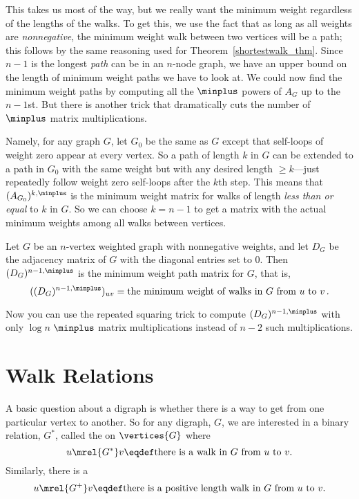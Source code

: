 \begin{editingnotes}
This takes us most of the way, but we really want the minimum weight
regardless of the lengths of the walks.  To get this, we use the fact that
as long as all weights are \emph{nonnegative}, the minimum weight walk
between two vertices will be a path; this follows by the same reasoning
used for Theorem~\ref{shortestwalk_thm}.  Since $n-1$ is the longest \emph{path}
can be in an $n$-node graph, we have an upper bound on the length of
minimum weight paths we have to look at.  We could now find the minimum
weight paths by computing all the $\minplus$ powers of $A_G$ up to the
$n-1$st.  But there is another trick that dramatically cuts the number of
$\minplus$ matrix multiplications.

Namely, for any graph $G$, let $G_0$ be the same as $G$ except that
self-loops of weight zero appear at every vertex.  So a path of length $k$
in $G$ can be extended to a path in $G_0$ with the same weight but with
any desired length $ \geq k$---just repeatedly follow weight zero
self-loops after the $k$th step.  This means that $(A_{G_0})^{k, \minplus}$
is the minimum weight matrix for walks of length \emph{less than or equal}
to $k$ in $G$.  So we can choose $k = n-1$ to get a matrix with the
actual minimum weights among all walks between vertices.

\begin{theorem}\label{thm:minweightmatrix}
Let $G$ be an $n$-vertex weighted graph with nonnegative weights, and let
$D_G$ be the adjacency matrix of $G$ with the diagonal entries set to 0.
Then $(D_G)^{n-1, \minplus}$ is the minimum weight path matrix for $G$, that
is,
\[
((D_G)^{n-1, \minplus})_{uv} = \text{the minimum weight of walks in $G$ from
 $u$ to $v$}\,.
\]
\end{theorem}
Now you can use the repeated squaring trick to compute $(D_G)^{n-1,
  \minplus}$ with only $\log n$ $\minplus$ matrix multiplications
instead of $n-2$ such multiplications.

\end{editingnotes}

\section{Walk Relations}\label{walk_relation_sec}
A basic question about a digraph is whether there is a way to get from one
particular vertex to another.  So for any digraph, $G$, we are
interested in a binary relation, $G^*$, called the  on $\vertices{G}$ where
\begin{equation}\label{G*def}
u \mrel{G^*} v \eqdef \mbox{there is a walk in $G$ from $u$ to $v$}.
\end{equation}
Similarly, there is a 
\begin{equation}\label{G+def}
u \mrel{G^+} v \eqdef \mbox{there is a positive length walk in $G$ from 
$u$ to $v$}.
\end{equation}

